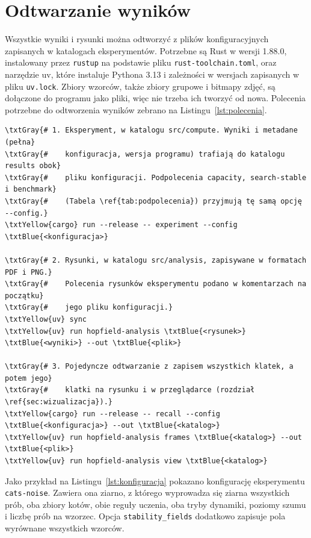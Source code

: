 \section{Odtwarzanie wyników}
\label{app:odtwarzanie}

Wszystkie wyniki i rysunki można odtworzyć z plików konfiguracyjnych zapisanych w katalogach eksperymentów. Potrzebne są Rust w wersji 1.88.0, instalowany przez \texttt{rustup} na podstawie pliku \texttt{rust-toolchain.toml}, oraz narzędzie uv, które instaluje Pythona 3.13 i zależności w wersjach zapisanych w pliku \texttt{uv.lock}. Zbiory wzorców, także zbiory grupowe i bitmapy zdjęć, są dołączone do programu jako pliki, więc nie trzeba ich tworzyć od nowa. Polecenia potrzebne do odtworzenia wyników zebrano na Listingu~\ref{lst:polecenia}.

\begin{code}[H]
\hypersetup{linkcolor=consoleGray}
\begin{Verbatim}[fontsize=\small, commandchars=\\\{\}]
\txtGray{# 1. Eksperyment, w katalogu src/compute. Wyniki i metadane (pełna}
\txtGray{#    konfiguracja, wersja programu) trafiają do katalogu results obok}
\txtGray{#    pliku konfiguracji. Podpolecenia capacity, search-stable i benchmark}
\txtGray{#    (Tabela \ref{tab:podpolecenia}) przyjmują tę samą opcję --config.}
\txtYellow{cargo} run --release -- experiment --config \txtBlue{<konfiguracja>}

\txtGray{# 2. Rysunki, w katalogu src/analysis, zapisywane w formatach PDF i PNG.}
\txtGray{#    Polecenia rysunków eksperymentu podano w komentarzach na początku}
\txtGray{#    jego pliku konfiguracji.}
\txtYellow{uv} sync
\txtYellow{uv} run hopfield-analysis \txtBlue{<rysunek>} \txtBlue{<wyniki>} --out \txtBlue{<plik>}

\txtGray{# 3. Pojedyncze odtwarzanie z zapisem wszystkich klatek, a potem jego}
\txtGray{#    klatki na rysunku i w przeglądarce (rozdział \ref{sec:wizualizacja}).}
\txtYellow{cargo} run --release -- recall --config \txtBlue{<konfiguracja>} --out \txtBlue{<katalog>}
\txtYellow{uv} run hopfield-analysis frames \txtBlue{<katalog>} --out \txtBlue{<plik>}
\txtYellow{uv} run hopfield-analysis view \txtBlue{<katalog>}
\end{Verbatim}
    \caption{Polecenia odtwarzające eksperymenty, rysunki i pojedyncze przebiegi.}
    \label{lst:polecenia}
\end{code}

\noindent Jako przykład na Listingu~\ref{lst:konfiguracja} pokazano konfigurację eksperymentu \texttt{cats-noise}. Zawiera ona ziarno, z którego wyprowadza się ziarna wszystkich prób, oba zbiory kotów, obie reguły uczenia, oba tryby dynamiki, poziomy szumu i liczbę prób na wzorzec. Opcja \texttt{stability\_fields} dodatkowo zapisuje pola wyrównane wszystkich wzorców.

\begin{code}[H]
    
    \caption{Konfiguracja eksperymentu \texttt{cats-noise} bez komentarzy.}
    \label{lst:konfiguracja}
\end{code}
